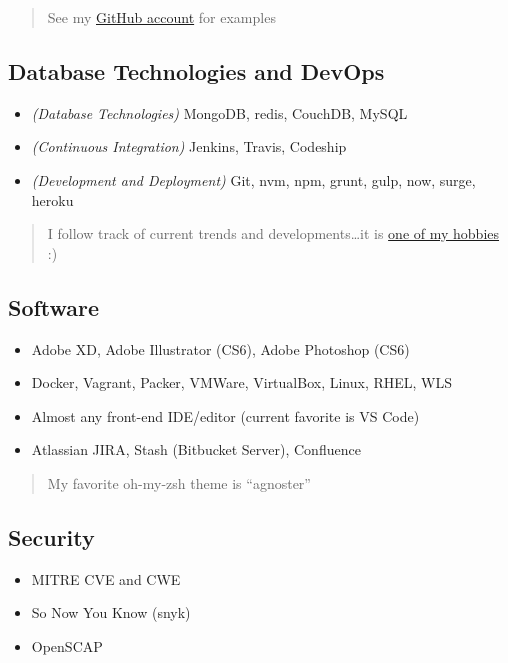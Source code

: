 \documentclass[10pt]{article}
\def\tightlist{}
\begin{document}
\begin{quote}
See my \href{https://github.com/jhwohlgemuth}{GitHub account} for
examples
\end{quote}

\subsection{Database Technologies and
DevOps}\label{database-technologies-and-devops}

\begin{itemize}
\tightlist
\item
  \emph{(Database Technologies)} MongoDB, redis, CouchDB, MySQL
\item
  \emph{(Continuous Integration)} Jenkins, Travis, Codeship
\item
  \emph{(Development and Deployment)} Git, nvm, npm, grunt, gulp, now,
  surge, heroku
\end{itemize}

\begin{quote}
I follow track of current trends and developments\ldots{}it is
\href{https://twitter.com/jhwohlgemuth}{one of my hobbies} :)
\end{quote}

\subsection{Software}\label{software}

\begin{itemize}
\tightlist
\item
  Adobe XD, Adobe Illustrator (CS6), Adobe Photoshop (CS6)
\item
  Docker, Vagrant, Packer, VMWare, VirtualBox, Linux, RHEL, WLS
\item
  Almost any front-end IDE/editor (current favorite is VS Code)
\item
  Atlassian JIRA, Stash (Bitbucket Server), Confluence
\end{itemize}

\begin{quote}
My favorite oh-my-zsh theme is ``agnoster''
\end{quote}

\subsection{Security}\label{security}

\begin{itemize}
\tightlist
\item
  MITRE CVE and CWE
\item
  So Now You Know (snyk)
\item
  OpenSCAP
\end{itemize}
\end{document}
